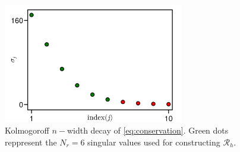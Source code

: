 \documentclass[../main.tex]{subfiles}
\begin{document}
\begin{figure}[H]
    \centering 
    \includegraphics[keepaspectratio, width=0.7\textwidth]{../figures/fig:conservation_decay.png}
    \caption{Kolmogoroff $n-$width decay of \eqref{eq:conservation}. Green dots reppresent the $N_{r}=6$ singular values used for constructing $\mathcal{R}_{h}$.}
    \label{fig:conservation_decay}
\end{figure}
\end{document}
